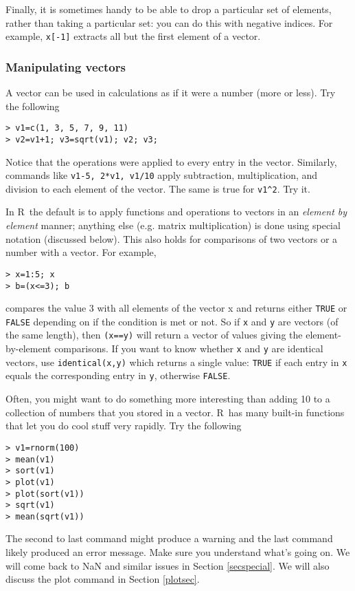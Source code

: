 \documentclass [11pt]{article}
\newcommand{\code}[1]{{\tt #1}}
\newcommand\R{{\sf R}}
\numberwithin{exercise}{section}
\begin{document}
Finally, it is sometimes handy to be able to drop a
particular set of elements, rather than taking a
particular set: you can do this with negative indices.
For example, \code{x[-1]} extracts all but the first
element of a vector.


\subsubsection{Manipulating vectors} 
A vector can be used in calculations as if it were a number (more or less). Try the following 
\vspace{-0.1in}
\begin{verbatim}
> v1=c(1, 3, 5, 7, 9, 11)
> v2=v1+1; v3=sqrt(v1); v2; v3; 
\end{verbatim}
\vspace{-0.1in}
Notice that the operations were applied to every entry in the vector. 
Similarly, commands like \texttt{v1-5, 2*v1, v1/10} 
apply subtraction, multiplication, and division to each element of the 
vector. The same is true for \verb+v1^2+. Try it.

In \R\ the default is to apply functions and operations to vectors
in an \textit{element by element} manner; anything else (e.g. matrix
multiplication) is done using special notation (discussed below). 
This also holds for comparisons of two vectors or a number with a vector. For example,
\vspace{-0.1in}
\begin{verbatim}
> x=1:5; x
> b=(x<=3); b
\end{verbatim}
\vspace{-0.1in}
compares the value 3 with all elements of the vector x and returns either \code{TRUE} or \code{FALSE} depending on if the condition is met or not.
So if \code{x} and \code{y} are vectors (of the same length), then \code{(x==y)} will return a vector of 
values giving the element-by-element comparisons. If you want to know
whether \code{x} and \code{y} are identical vectors, use \code{identical(x,y)}
which returns a single value: \code{TRUE} if each entry in \code{x} equals the
corresponding entry in \code{y}, otherwise \code{FALSE}. 


Often, you might want to do something more interesting than adding 10 to a collection of numbers that you stored in a vector. \R\ has many built-in functions that let you do cool stuff very rapidly. Try the following
\vspace{-0.1in}
\begin{verbatim}
> v1=rnorm(100)
> mean(v1)
> sort(v1)
> plot(v1)
> plot(sort(v1))
> sqrt(v1)
> mean(sqrt(v1))
\end{verbatim}
\vspace{-0.1in}
The second to last command might produce a warning and the last command likely produced an error message. Make sure you understand what's going on. We will come back to NaN and similar issues in Section \ref{secspecial}. We will also discuss the plot command in Section \ref{plotsec}.
\end{document}
